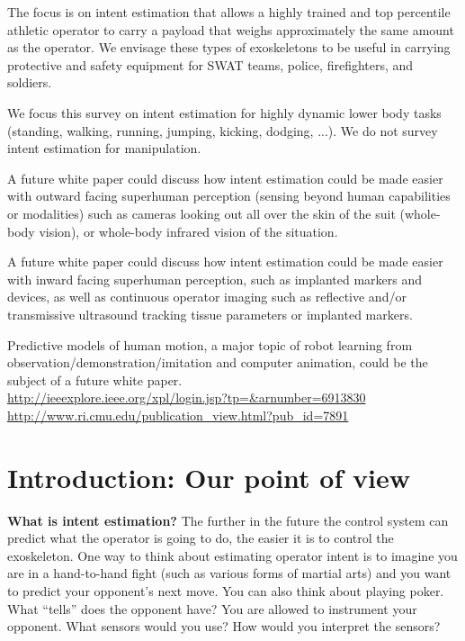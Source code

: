 \documentclass[letterpaper,12pt,fullpage]{article}
\begin{document}
The focus is on intent estimation that allows a
highly trained and top percentile athletic 
operator to carry a payload that weighs approximately the same amount
as the operator. We envisage these types of exoskeletons to be useful
in carrying protective and safety equipment for SWAT teams, police,
firefighters, and soldiers. 

We focus this survey on intent estimation for highly dynamic 
lower body tasks (standing, walking,
running, jumping, kicking, dodging, ...).
We do not survey intent estimation for manipulation. 

A future white paper could discuss how intent estimation could be 
made easier with outward facing
superhuman perception (sensing beyond human capabilities
or modalities) such as cameras looking out all over the skin
of the suit (whole-body vision), or whole-body 
infrared vision of the situation.

A future white paper could discuss how intent estimation could be 
made easier with inward facing superhuman perception,
such as implanted markers and devices, as well as continuous
operator imaging such as reflective and/or transmissive ultrasound
tracking tissue parameters or implanted markers.

Predictive models of human motion, a major topic of robot learning from\\
observation/demonstration/imitation and computer animation,
could be the subject of a future white
paper.\\
\url{http://ieeexplore.ieee.org/xpl/login.jsp?tp=&arnumber=6913830}\\
\url{http://www.ri.cmu.edu/publication_view.html?pub_id=7891}

\section{Introduction: Our point of view}

{\bf What is intent estimation?}
The further in the future the control system can predict what the operator
is going to do, the easier it is to control the exoskeleton. One way
to think about estimating operator intent is to imagine you are in
a hand-to-hand fight (such as various forms of martial arts)
and you want to predict your opponent's next move.
You can also think about playing poker. What ``tells'' does the opponent
have?
You are allowed to instrument your opponent. What sensors would you use?
How would you interpret the sensors?
\end{document}
